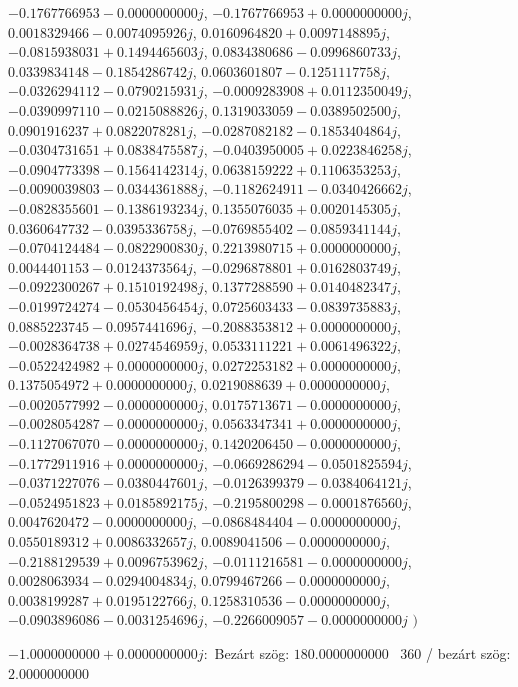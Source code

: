 \documentclass[14pt,a4paper]{article}
\begin{document}
\begin{itemize}
$-0.1767766953-0.0000000000j$, $-0.1767766953+0.0000000000j$, $0.0018329466-0.0074095926j$, $0.0160964820+0.0097148895j$, $-0.0815938031+0.1494465603j$, $0.0834380686-0.0996860733j$, $0.0339834148-0.1854286742j$, $0.0603601807-0.1251117758j$, $-0.0326294112-0.0790215931j$, $-0.0009283908+0.0112350049j$, $-0.0390997110-0.0215088826j$, $0.1319033059-0.0389502500j$, $0.0901916237+0.0822078281j$, $-0.0287082182-0.1853404864j$, $-0.0304731651+0.0838475587j$, $-0.0403950005+0.0223846258j$, $-0.0904773398-0.1564142314j$, $0.0638159222+0.1106353253j$, $-0.0090039803-0.0344361888j$, $-0.1182624911-0.0340426662j$, $-0.0828355601-0.1386193234j$, $0.1355076035+0.0020145305j$, $0.0360647732-0.0395336758j$, $-0.0769855402-0.0859341144j$, $-0.0704124484-0.0822900830j$, $0.2213980715+0.0000000000j$, $0.0044401153-0.0124373564j$, $-0.0296878801+0.0162803749j$, $-0.0922300267+0.1510192498j$, $0.1377288590+0.0140482347j$, $-0.0199724274-0.0530456454j$, $0.0725603433-0.0839735883j$, $0.0885223745-0.0957441696j$, $-0.2088353812+0.0000000000j$, $-0.0028364738+0.0274546959j$, $0.0533111221+0.0061496322j$, $-0.0522424982+0.0000000000j$, $0.0272253182+0.0000000000j$, $0.1375054972+0.0000000000j$, $0.0219088639+0.0000000000j$, $-0.0020577992-0.0000000000j$, $0.0175713671-0.0000000000j$, $-0.0028054287-0.0000000000j$, $0.0563347341+0.0000000000j$, $-0.1127067070-0.0000000000j$, $0.1420206450-0.0000000000j$, $-0.1772911916+0.0000000000j$, $-0.0669286294-0.0501825594j$, $-0.0371227076-0.0380447601j$, $-0.0126399379-0.0384064121j$, $-0.0524951823+0.0185892175j$, $-0.2195800298-0.0001876560j$, $0.0047620472-0.0000000000j$, $-0.0868484404-0.0000000000j$, $0.0550189312+0.0086332657j$, $0.0089041506-0.0000000000j$, $-0.2188129539+0.0096753962j$, $-0.0111216581-0.0000000000j$, $0.0028063934-0.0294004834j$, $0.0799467266-0.0000000000j$, $0.0038199287+0.0195122766j$, $0.1258310536-0.0000000000j$, $-0.0903896086-0.0031254696j$, $-0.2266009057-0.0000000000j$
$\big)$
\end{itemize}
$-1.0000000000+0.0000000000j$:\
Bezárt szög: $180.0000000000$ \
360 / bezárt szög: $2.0000000000$\
\end{document}
